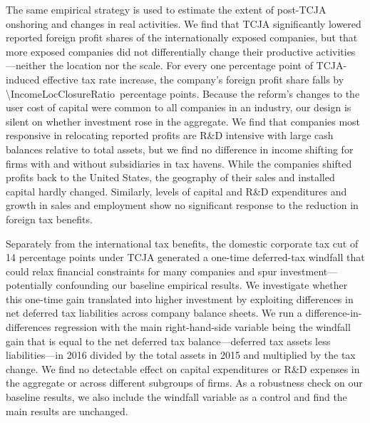 \documentclass[11pt,letterpaper]{article}
\newcommand{\RatioNum}[1]{\num[round-mode=places,round-precision=2]{#1}}
\begin{document}
The same empirical strategy is used to estimate the extent of post-TCJA
onshoring and changes in real activities.
We find that TCJA significantly 
lowered reported foreign profit shares of the internationally
exposed companies, but that more exposed companies did not
differentially change their productive activities---neither the
location nor the scale. 
For every one percentage point of TCJA-induced effective tax rate increase,
the company's foreign profit share falls by 
\RatioNum{\IncomeLocClosureRatio}\ percentage points.
Because the reform's changes to the user cost
of capital were common to all companies in an industry, our design is
silent on whether investment rose in the aggregate.
We find that companies most responsive in relocating reported
profits are R\&D intensive with 
large cash balances relative to total assets, but we find no difference in 
income shifting for firms with and without subsidiaries in tax havens.
While the companies shifted profits back to the United
States, the geography of their sales and installed capital hardly changed.
Similarly, levels of capital and R\&D expenditures and growth in 
sales and employment show no significant response to the
reduction in foreign tax benefits.

Separately from the international tax benefits, the domestic corporate
tax cut of 14 percentage points under TCJA generated a one-time 
deferred-tax windfall that could relax financial constraints for
many companies and spur investment---potentially confounding our 
baseline empirical results.
We investigate whether this one-time gain
translated into higher investment by exploiting differences in 
net deferred tax liabilities across company balance sheets. 
We run a difference-in-differences regression with the main
right-hand-side variable being the windfall gain that is equal 
to the net deferred tax balance---deferred tax assets less 
liabilities---in 2016 divided by the total assets in 
2015 and multiplied by the tax change. We find
no detectable effect on capital expenditures or R\&D expenses
in the aggregate or across different subgroups of firms. 
As a robustness check on our baseline results, we also include
the windfall variable as a control and find the main results
are unchanged.
\end{document}
